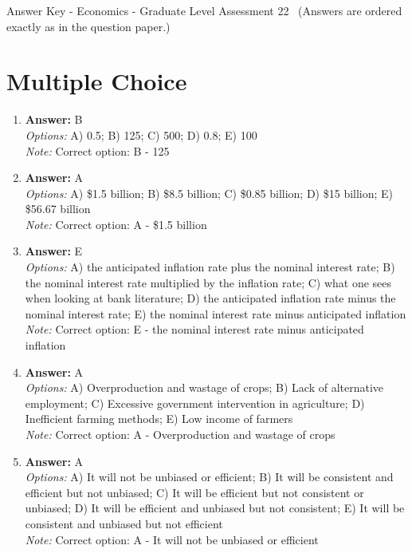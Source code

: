 \documentclass[12pt]{article}
\begin{document}
\begin{center}
Answer Key - Economics - Graduate Level Assessment 22 \
\small (Answers are ordered exactly as in the question paper.)
\end{center}

\section*{Multiple Choice}
\begin{enumerate}[label=\arabic*.]
\item \textbf{Answer:} B
\\ \textit{Options:} A) 0.5; B) 125; C) 500; D) 0.8; E) 100
\\ \textit{Note:} Correct option: B - 125
\item \textbf{Answer:} A
\\ \textit{Options:} A) \$1.5 billion; B) \$8.5 billion; C) \$0.85 billion; D) \$15 billion; E) \$56.67 billion
\\ \textit{Note:} Correct option: A - \$1.5 billion
\item \textbf{Answer:} E
\\ \textit{Options:} A) the anticipated inflation rate plus the nominal interest rate; B) the nominal interest rate multiplied by the inflation rate; C) what one sees when looking at bank literature; D) the anticipated inflation rate minus the nominal interest rate; E) the nominal interest rate minus anticipated inflation
\\ \textit{Note:} Correct option: E - the nominal interest rate minus anticipated inflation
\item \textbf{Answer:} A
\\ \textit{Options:} A) Overproduction and wastage of crops; B) Lack of alternative employment; C) Excessive government intervention in agriculture; D) Inefficient farming methods; E) Low income of farmers
\\ \textit{Note:} Correct option: A - Overproduction and wastage of crops
\item \textbf{Answer:} A
\\ \textit{Options:} A) It will not be unbiased or efficient; B) It will be consistent and efficient but not unbiased; C) It will be efficient but not consistent or unbiased; D) It will be efficient and unbiased but not consistent; E) It will be consistent and unbiased but not efficient
\\ \textit{Note:} Correct option: A - It will not be unbiased or efficient
\end{enumerate}
\end{document}
